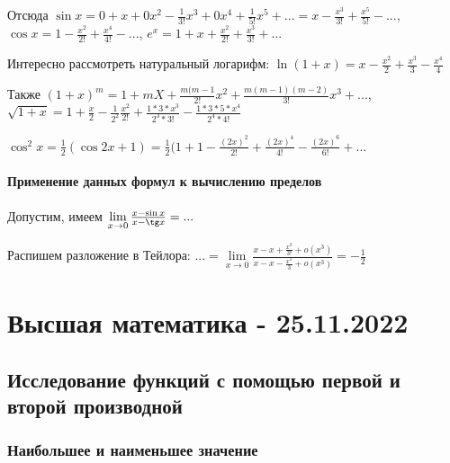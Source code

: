 \documentclass{article}
\begin{document}
\begin{flushleft}
Отсюда $\sin x = 0 + x + 0x^2 - \frac{1}{3!}x^3 + 0x^4 + \frac{1}{5!}x^5 + ... = x - \frac{x^3}{3!} + \frac{x^5}{5!} - ...$, $\cos x = 1 - \frac{x^2}{2!} + \frac{x^4}{4!} - ...$, $e^{x} = 1 + x + \frac{x^2}{2!} + \frac{x^3}{3!} + ...$

Интересно рассмотреть натуральный логарифм: $\ln (1 + x) = x - \frac{x^2}{2} + \frac{x^3}{3} - \frac{x^4}{4}$

Также $(1 + x)^m = 1 + m X + \frac{m(m - 1}{2!}x^2 + \frac{m(m - 1)(m - 2)}{3!}x^3 + ...$, $\sqrt{1 + x} = 1 + \frac{x}{2} - \frac{1}{2^2} \frac{x^2}{2!} + \frac{1 * 3 * x^3}{2^3 * 3!} - \frac{1 * 3 * 5 * x^4}{2^4 * 4!}$

$\cos^2 x = \frac{1}{2} (\cos 2x + 1) = \frac{1}{2} (1 + 1 - \frac{(2x)^2}{2!} + \frac{(2x)^4}{4!} - \frac{(2x)^6}{6!} + ...$

\paragraph{Применение данных формул к вычислению пределов}

Допустим, имеем $\lim\limits_{x \to 0} \frac{x - \sin x}{x - \tg x} = ...$

Распишем разложение в Тейлора: $... = \lim\limits_{x \to 0} \frac{x - x + \frac{x^3}{3!} + o(x^3)}{x - x - \frac{x^3}{3} + o(x^3)} = -\frac{1}{2}$

\end{flushleft}

\pagebreak
\section{Высшая математика - 25.11.2022}

\subsection{Исследование функций с помощью первой и второй производной}

\subsubsection{Наибольшее и наименьшее значение}
\end{document}
